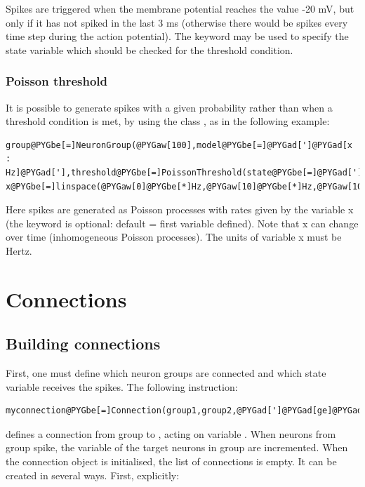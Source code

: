 \documentclass[letterpaper,10pt]{manual}
\begin{document}
Spikes are triggered when the membrane potential reaches the value -20 mV, but only if it
has not spiked in the last 3 ms (otherwise there would be spikes every time step during the action
potential). The  keyword may be used to specify the state variable which should be checked
for the threshold condition.


\subsubsection{Poisson threshold}

It is possible to generate spikes with a given probability rather than when a threshold condition
is met, by using the class , as in the following example:

\begin{Verbatim}[commandchars=@\[\]]
group@PYGbe[=]NeuronGroup(@PYGaw[100],model@PYGbe[=]@PYGad[']@PYGad[x : Hz]@PYGad['],threshold@PYGbe[=]PoissonThreshold(state@PYGbe[=]@PYGad[']@PYGad[x]@PYGad[']))
x@PYGbe[=]linspace(@PYGaw[0]@PYGbe[*]Hz,@PYGaw[10]@PYGbe[*]Hz,@PYGaw[100])
\end{Verbatim}

Here spikes are generated as Poisson processes with rates given by the variable x
(the  keyword is optional: default = first variable defined). Note that x can
change over time (inhomogeneous Poisson processes). The units of variable x must be Hertz.

\resetcurrentobjects


\section{Connections}


\subsection{Building connections}

First, one must define which neuron groups are connected and which state variable receives the spikes.
The following instruction:

\begin{Verbatim}[commandchars=@\[\]]
myconnection@PYGbe[=]Connection(group1,group2,@PYGad[']@PYGad[ge]@PYGad['])
\end{Verbatim}

defines a connection from group  to , acting on variable . When
neurons from group  spike, the variable  of the target neurons in group
 are incremented. When the connection object is initialised, the list of connections
is empty. It can be created in several ways. First, explicitly:
\end{document}
